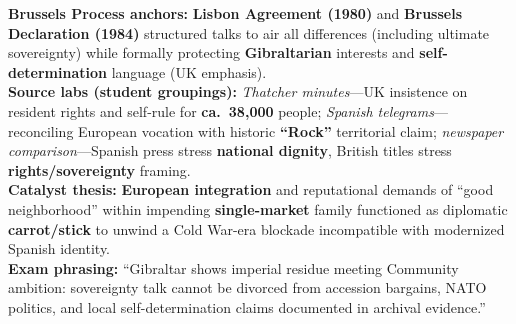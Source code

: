 \documentclass[10pt,a4paper]{article}
\begin{document}
{\textbf{Brussels Process anchors:} \textbf{Lisbon Agreement (1980)} and \textbf{Brussels Declaration (1984)} structured talks to air all differences (including ultimate sovereignty) while formally protecting \textbf{Gibraltarian} interests and \textbf{self-determination} language (UK emphasis).\\
\textbf{Source labs (student groupings):} \textit{Thatcher minutes}---UK insistence on resident rights and self-rule for \textbf{ca.\ 38{,}000} people; \textit{Spanish telegrams}---reconciling European vocation with historic \textbf{``Rock''} territorial claim; \textit{newspaper comparison}---Spanish press stress \textbf{national dignity}, British titles stress \textbf{rights/sovereignty} framing.\\
\textbf{Catalyst thesis:} \textbf{European integration} and reputational demands of ``good neighborhood'' within impending \textbf{single-market} family functioned as diplomatic \textbf{carrot/stick} to unwind a Cold War-era blockade incompatible with modernized Spanish identity.\\
\textbf{Exam phrasing:} ``Gibraltar shows imperial residue meeting Community ambition: sovereignty talk cannot be divorced from accession bargains, NATO politics, and local self-determination claims documented in archival evidence.''
}
\end{document}
